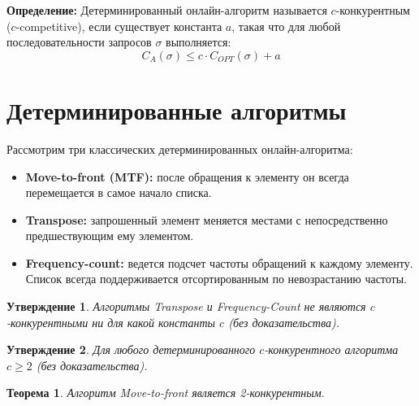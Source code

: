 \documentclass[12pt, a4paper]{article}
\newtheorem{theorem}{Теорема}
\newtheorem{proposition}{Утверждение}
\begin{document}
\textbf{Определение:} Детерминированный онлайн-алгоритм называется $c$-конкурентным ($c$-competitive), если существует константа $a$, такая что для любой последовательности запросов $\sigma$ выполняется:
$$C_A(\sigma) \le c \cdot C_{OPT}(\sigma) + a$$

\section{Детерминированные алгоритмы}
Рассмотрим три классических детерминированных онлайн-алгоритма:
\begin{itemize}
    \item \textbf{Move-to-front (MTF):} после обращения к элементу он всегда перемещается в самое начало списка.
    \item \textbf{Transpose:} запрошенный элемент меняется местами с непосредственно предшествующим ему элементом.
    \item \textbf{Frequency-count:} ведется подсчет частоты обращений к каждому элементу. Список всегда поддерживается отсортированным по невозрастанию частоты.
\end{itemize}

\begin{proposition}
Алгоритмы Transpose и Frequency-Count не являются $c$-конкурентными ни для какой константы $c$ (без доказательства).
\end{proposition}

\begin{proposition}
Для любого детерминированного $c$-конкурентного алгоритма $c \geq 2$ (без доказательства).
\end{proposition}

\begin{theorem}
Алгоритм Move-to-front является 2-конкурентным.
\end{theorem}
\end{document}

